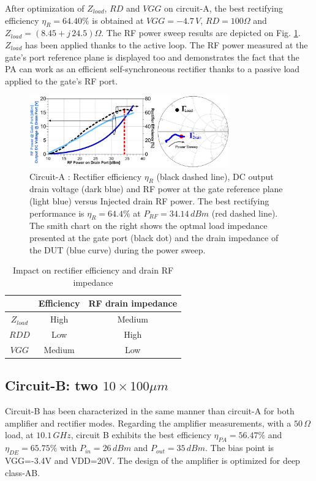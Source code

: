 \documentclass[conference]{IEEEtran}
\begin{document}
After optimization of $Z_{load}$, $RD$ and $VGG$ on circuit-A, the best rectifying efficiency $\eta_R=64.40\%$ is obtained at $VGG=-4.7\,V$, $RD=100\Omega$ and  $Z_{load}=(8.45+j\,24.5)\Omega$. The RF power sweep results are depicted on Fig. \ref{mike_rect}. $Z_{load}$ has been applied thanks to the active loop. The RF power measured at the gate's port reference plane is displayed too and demonstrates the fact that the PA can work as an efficient self-synchroneous rectifier thanks to a passive load applied to the gate's RF port.

\begin{figure}[ht!] %
\centering
\includegraphics[width=3.4in]{IMS2014_Mike_Rectifier.pdf}
\caption{ Circuit-A :  Rectifier efficiency $\eta_R$ (black dashed line), DC output drain voltage (dark blue) and RF power at the gate reference plane (light blue) versus Injected drain RF power. The best rectifying performance is $\eta_R=64.4\%$ at $P_{RF}=34.14\,dBm$ (red dashed line). The smith chart on the right shows the optmal load impedance presented at the gate port (black dot) and the drain impedance of the DUT (blue curve) during the power sweep.
}
\label{mike_rect}
\end{figure}

\begin{table}[ht]
\caption{Impact on rectifier efficiency and drain RF impedance} %
\centering
\begin{tabular}{|c| c | c |  }
\hline
 &Efficiency & RF drain impedance\\
\hline
$Z_{load}$ & High & Medium\\
$RDD$ & Low & High\\
$VGG$ & Medium & Low\\
\hline
\end{tabular}
\label{tab:var}
\end{table}



\subsection{Circuit-B: two $10\times100\mu m$}
Circuit-B has been characterized in the same manner than circuit-A for both amplifier and rectifier modes.
Regarding the amplifier measurements, with a $50\,\Omega$ load, at $10.1\,GHz$, circuit B exhibits the best efficiency $\eta_{PA}=56.47\%$ and $\eta_{DE}=65.75\%$ with $P_{in}=26\,dBm$ and  $P_{out}=35\,dBm$. The bias point is VGG=-3.4V and VDD=20V.
The design of the amplifier is optimized for deep class-AB.
\end{document}
